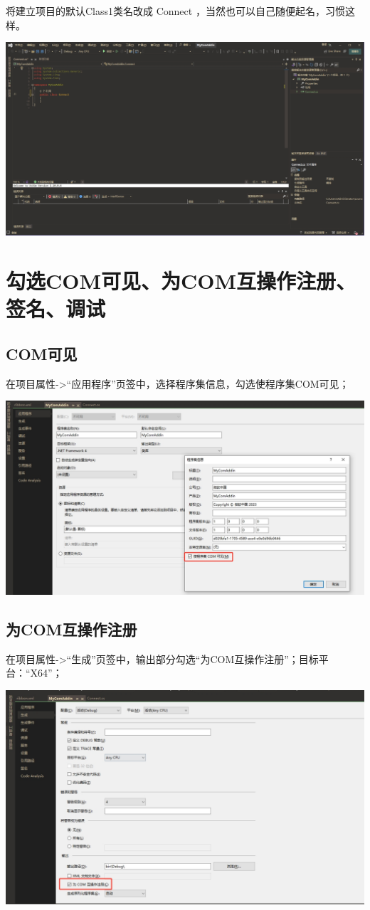 \documentclass[math,code]{amznotes}
\begin{document}
    将建立项目的默认Class1类名改成 Connect ，当然也可以自己随便起名，习惯这样。
    
	\includegraphics[width=1\linewidth]{pic/connect}
	\section{勾选COM可见、为COM互操作注册、签名、调试\cite{CS_OneNote}}
	\subsection{COM可见}
	在项目属性->“应用程序”页签中，选择程序集信息，勾选使程序集COM可见；
	
	\includegraphics[width=0.9\linewidth]{pic/COM_visible}
	
	\subsection{为COM互操作注册}
	在项目属性->“生成”页签中，输出部分勾选“为COM互操作注册”；目标平台：“X64”；
	
	\includegraphics[width=0.9\linewidth]{pic/Com_interop}
		
\end{document}
